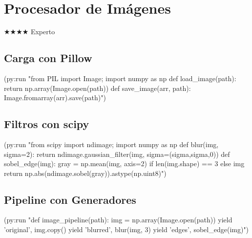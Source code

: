 \chapter{Procesador de Imágenes}
\label{chap:image-processor}
{\huge$\bigstar$}{\huge$\bigstar$}{\huge$\bigstar$}{\huge$\bigstar$} Experto

\section{Carga con Pillow}
\begin{lispcode}
(py:run "from PIL import Image; import numpy as np
def load_image(path): return np.array(Image.open(path))
def save_image(arr, path): Image.fromarray(arr).save(path)")
\end{lispcode}

\section{Filtros con scipy}
\begin{lispcode}
(py:run "from scipy import ndimage; import numpy as np
def blur(img, sigma=2): return ndimage.gaussian_filter(img, sigma=(sigma,sigma,0))
def sobel_edge(img):
    gray = np.mean(img, axis=2) if len(img.shape) == 3 else img
    return np.abs(ndimage.sobel(gray)).astype(np.uint8)")
\end{lispcode}

\section{Pipeline con Generadores}
\begin{lispcode}
(py:run "def image_pipeline(path):
    img = np.array(Image.open(path))
    yield 'original', img.copy()
    yield 'blurred', blur(img, 3)
    yield 'edges', sobel_edge(img)")
\end{lispcode}

